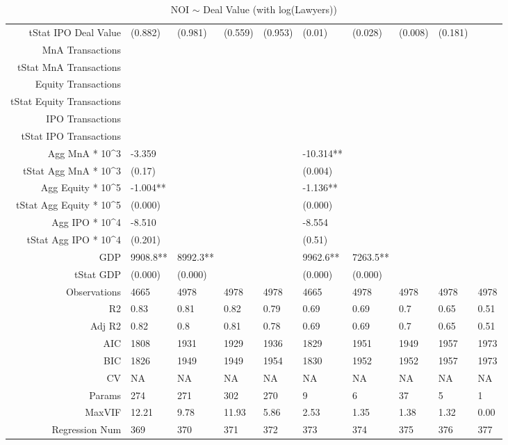 \begin{table}[ht]
\begin{tabular}{rlllllllll}
  tStat IPO Deal Value & (0.882) & (0.981) & (0.559) & (0.953) & (0.01) & (0.028) & (0.008) & (0.181) &  \\ 
  MnA Transactions &  &  &  &  &  &  &  &  &  \\ 
  tStat MnA Transactions &  &  &  &  &  &  &  &  &  \\ 
  Equity Transactions &  &  &  &  &  &  &  &  &  \\ 
  tStat Equity Transactions &  &  &  &  &  &  &  &  &  \\ 
  IPO Transactions &  &  &  &  &  &  &  &  &  \\ 
  tStat IPO Transactions &  &  &  &  &  &  &  &  &  \\ 
  Agg MnA * 10^3 & -3.359 &  &  &  & -10.314** &  &  &  &  \\ 
  tStat Agg MnA * 10^3 & (0.17) &  &  &  & (0.004) &  &  &  &  \\ 
  Agg Equity * 10^5 & -1.004** &  &  &  & -1.136** &  &  &  &  \\ 
  tStat Agg Equity * 10^5 & (0.000) &  &  &  & (0.000) &  &  &  &  \\ 
  Agg IPO * 10^4 & -8.510 &  &  &  & -8.554 &  &  &  &  \\ 
  tStat Agg IPO * 10^4 & (0.201) &  &  &  & (0.51) &  &  &  &  \\ 
  GDP & 9908.8** & 8992.3** &  &  & 9962.6** & 7263.5** &  &  &  \\ 
  tStat GDP & (0.000) & (0.000) &  &  & (0.000) & (0.000) &  &  &  \\ 
  Observations & 4665 & 4978 & 4978 & 4978 & 4665 & 4978 & 4978 & 4978 & 4978 \\ 
  R2 & 0.83 & 0.81 & 0.82 & 0.79 & 0.69 & 0.69 & 0.7 & 0.65 & 0.51 \\ 
  Adj R2 & 0.82 & 0.8 & 0.81 & 0.78 & 0.69 & 0.69 & 0.7 & 0.65 & 0.51 \\ 
  AIC & 1808 & 1931 & 1929 & 1936 & 1829 & 1951 & 1949 & 1957 & 1973 \\ 
  BIC & 1826 & 1949 & 1949 & 1954 & 1830 & 1952 & 1952 & 1957 & 1973 \\ 
  CV & NA & NA & NA & NA & NA & NA & NA & NA & NA \\ 
  Params & 274 & 271 & 302 & 270 & 9 & 6 & 37 & 5 & 1 \\ 
  MaxVIF & 12.21 & 9.78 & 11.93 & 5.86 & 2.53 & 1.35 & 1.38 & 1.32 & 0.00 \\ 
  Regression Num & 369 & 370 & 371 & 372 & 373 & 374 & 375 & 376 & 377 \\ 
   \hline
\end{tabular}
\caption{NOI $\sim$ Deal Value (with log(Lawyers))} 
\end{table}
